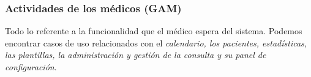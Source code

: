 
				\newpage
				\subsubsection{Actividades de los médicos (GAM)} %
				\label{sub:actividades_de_los_medicos}
				Todo lo referente a la funcionalidad que el médico espera del sistema. Podemos encontrar casos de uso relacionados con el \textit{calendario, los pacientes, estadísticas, las plantillas, la administración y gestión de la consulta y su panel de configuración}.
					\newline
					\newline

